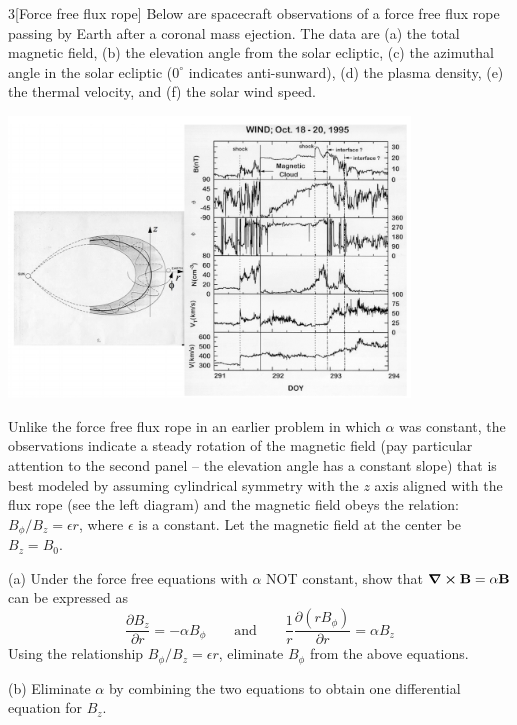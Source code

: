 \documentclass[12pt]{article}
\begin{document}
\begin{problem}{3}[Force free flux rope]
Below are spacecraft observations of a force free flux rope passing by Earth
after a coronal mass ejection. The data are (a) the total magnetic field, (b)
the elevation angle from the solar ecliptic, (c) the azimuthal angle in the
solar ecliptic ($0^\circ$ indicates anti-sunward), (d) the plasma density, (e)
the thermal velocity, and (f) the solar wind speed.
\begin{center}
    \includegraphics[width=0.8\textwidth]{hw3_p3.jpg} 
\end{center}
Unlike the force free flux rope in an earlier problem in which $\alpha$ was
constant, the observations indicate a steady rotation of the magnetic field (pay
particular attention to the second panel -- the elevation angle has a constant
slope) that is best modeled by assuming cylindrical symmetry with the $z$ axis
aligned with the flux rope (see the left diagram) and the magnetic field obeys
the relation: $B_\phi /B_z=\epsilon r$, where $\epsilon$ is a constant. Let the
magnetic field at the center be $B_z=B_0$.

(a) Under the force free equations with $\alpha$ NOT constant, show that
$\curl{\vb{B}}=\alpha\vb{B}$ can be expressed as
\begin{equation}
    \frac{\partial B_z}{\partial r}=-\alpha B_\phi
    \qquad\text{and}\qquad
    \frac1r\frac{\partial(rB_\phi)}{\partial r}=\alpha B_z
\end{equation}
Using the relationship $B_\phi /B_z=\epsilon r$, eliminate $B_\phi$ from the
above equations.

(b) Eliminate $\alpha$ by combining the two equations to obtain one differential
equation for $B_z$.


\end{problem}
\end{document}
